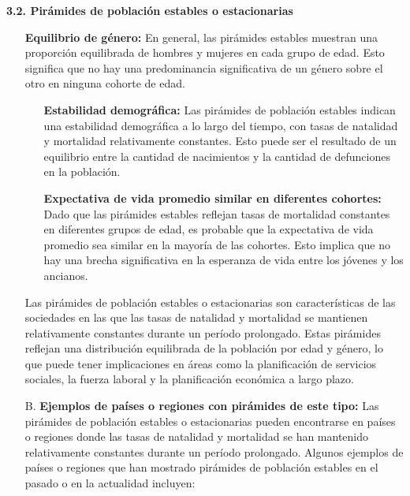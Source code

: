 \documentclass[8pt,a4paper]{beamer}
\begin{document}
{\begin{frame}{}
\begin{block}{\textbf{3.2. Pirámides de población estables o estacionarias}}
\begin{enumerate}
\begin{itemize}
\item[\ding{65}]  \textbf{Equilibrio de género:} En general, las pirámides estables muestran una proporción equilibrada de hombres y mujeres en cada grupo de edad. Esto significa que no hay una predominancia significativa de un género sobre el otro en ninguna cohorte de edad.
\end{itemize}

\end{enumerate}
\end{block}
\end{frame}

\begin{frame}{}
\begin{block}{}
\begin{enumerate}
\justifying
\item[{}] 
\begin{itemize}
\justifying
\item[\ding{65}] \textbf{Estabilidad demográfica:} Las pirámides de población estables indican una estabilidad demográfica a lo largo del tiempo, con tasas de natalidad y mortalidad relativamente constantes. Esto puede ser el resultado de un equilibrio entre la cantidad de nacimientos y la cantidad de defunciones en la población.

\item[\ding{65}] \textbf{Expectativa de vida promedio similar en diferentes cohortes:} Dado que las pirámides estables reflejan tasas de mortalidad constantes en diferentes grupos de edad, es probable que la expectativa de vida promedio sea similar en la mayoría de las cohortes. Esto implica que no hay una brecha significativa en la esperanza de vida entre los jóvenes y los ancianos.
\end{itemize}
Las pirámides de población estables o estacionarias son características de las sociedades en las que las tasas de natalidad y mortalidad se mantienen relativamente constantes durante un período prolongado. Estas pirámides reflejan una distribución equilibrada de la población por edad y género, lo que puede tener implicaciones en áreas como la planificación de servicios sociales, la fuerza laboral y la planificación económica a largo plazo.
\item[B.] \textbf{Ejemplos de países o regiones con pirámides de este tipo:} Las pirámides de población estables o estacionarias pueden encontrarse en países o regiones donde las tasas de natalidad y mortalidad se han mantenido relativamente constantes durante un período prolongado. Algunos ejemplos de países o regiones que han mostrado pirámides de población estables en el pasado o en la actualidad incluyen:
\end{enumerate}
\end{block}
\end{frame}

}
\end{document}

